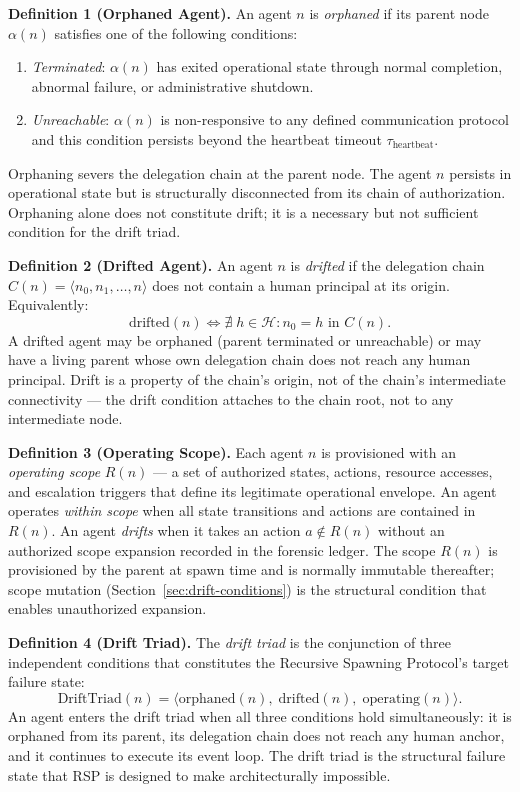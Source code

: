 \documentclass[12pt]{article}
\begin{document}
\medskip
\noindent\textbf{Definition 1 (Orphaned Agent).}
An agent $n$ is \emph{orphaned} if its parent node $\alpha(n)$ satisfies one of the following conditions:
\begin{enumerate}
  \item[(a)] \emph{Terminated}: $\alpha(n)$ has exited operational state through normal completion, abnormal failure, or administrative shutdown.
  \item[(b)] \emph{Unreachable}: $\alpha(n)$ is non-responsive to any defined communication protocol and this condition persists beyond the heartbeat timeout $\tau_{\text{heartbeat}}$.
\end{enumerate}
Orphaning severs the delegation chain at the parent node. The agent $n$ persists in operational state but is structurally disconnected from its chain of authorization. Orphaning alone does not constitute drift; it is a necessary but not sufficient condition for the drift triad.

\medskip
\noindent\textbf{Definition 2 (Drifted Agent).}
An agent $n$ is \emph{drifted} if the delegation chain $C(n) = \langle n_0, n_1, \ldots, n \rangle$ does not contain a human principal at its origin. Equivalently:
\begin{equation}
\text{drifted}(n) \iff \nexists\; h \in \mathcal{H} : n_0 = h \text{ in } C(n).
\label{eq:drifted-def}
\end{equation}
A drifted agent may be orphaned (parent terminated or unreachable) or may have a living parent whose own delegation chain does not reach any human principal. Drift is a property of the chain's origin, not of the chain's intermediate connectivity — the drift condition attaches to the chain root, not to any intermediate node.

\medskip
\noindent\textbf{Definition 3 (Operating Scope).}
Each agent $n$ is provisioned with an \emph{operating scope} $R(n)$ — a set of authorized states, actions, resource accesses, and escalation triggers that define its legitimate operational envelope. An agent operates \emph{within scope} when all state transitions and actions are contained in $R(n)$. An agent \emph{drifts} when it takes an action $a \notin R(n)$ without an authorized scope expansion recorded in the forensic ledger. The scope $R(n)$ is provisioned by the parent at spawn time and is normally immutable thereafter; scope mutation (Section~\ref{sec:drift-conditions}) is the structural condition that enables unauthorized expansion.

\medskip
\noindent\textbf{Definition 4 (Drift Triad).}
The \emph{drift triad} is the conjunction of three independent conditions that constitutes the Recursive Spawning Protocol's target failure state:
\begin{equation}
\text{DriftTriad}(n) = \langle \text{orphaned}(n),\; \text{drifted}(n),\; \text{operating}(n) \rangle.
\label{eq:drift-triad}
\end{equation}
An agent enters the drift triad when all three conditions hold simultaneously: it is orphaned from its parent, its delegation chain does not reach any human anchor, and it continues to execute its event loop. The drift triad is the structural failure state that RSP is designed to make architecturally impossible.
\end{document}

